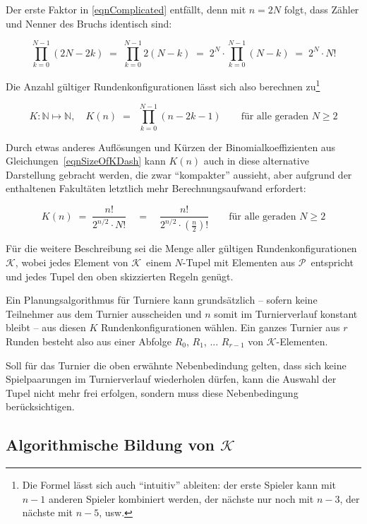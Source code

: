\documentclass[DIV=15, 10pt]{scrartcl}
\newcommand{\PSet}{$\mathcal{P}$}
\newcommand{\KSet}{$\mathcal{K}$}
\begin{document}
Der erste Faktor in \eqref{eqnComplicated} entfällt, denn mit $n = 2N$ folgt, dass Zähler und Nenner des Bruchs identisch sind:

\begin{equation*}
\prod_{k=0}^{N-1}(2N - 2k) \; = \;
\prod_{k=0}^{N-1}2(N-k) \; = \;
2^N \cdot \prod_{k=0}^{N-1}(N-k) \; = \; 2^N \cdot N!
\end{equation*}

Die Anzahl gültiger Rundenkonfigurationen lässt sich also berechnen zu\footnote{Die Formel lässt sich auch "`intuitiv"' ableiten: der erste Spieler kann mit $n-1$ anderen Spieler kombiniert werden, der nächste nur noch mit $n-3$, der nächste mit $n-5$, usw.}

\begin{equation}\label{eqnSizeOfK}
K: \mathbb{N} \mapsto \mathbb{N}, \quad K(n) \; = \; \
\prod_{k=0}^{N-1}(n - 2k -1) \qquad \text{für alle geraden }N \geq 2
\end{equation}

Durch etwas anderes Auflösungen und Kürzen der Binomialkoeffizienten aus Gleichungen~\eqref{eqnSizeOfKDash} kann $K(n)$ auch in diese alternative Darstellung gebracht werden, die zwar "`kompakter"' aussieht, aber aufgrund der enthaltenen Fakultäten letztlich mehr Berechnungsaufwand erfordert:

\begin{equation}\label{eqnSizeOfK1}
K(n) \; = \; \frac{n!}{2^{n/2} \cdot N!} \quad = \quad \frac{n!}{2^{n/2} \cdot \left(\frac{n}{2}\right)!} \qquad \text{für alle geraden }N \geq 2
\end{equation}


Für die weitere Beschreibung sei die Menge aller gültigen Rundenkonfigurationen \KSet, wobei jedes Element von \KSet\ einem $N$-Tupel mit Elementen aus \PSet\ entspricht und jedes Tupel den oben skizzierten Regeln genügt.

Ein Planungsalgorithmus für Turniere kann grundsätzlich -- sofern keine Teilnehmer aus dem Turnier ausscheiden und $n$ somit im Turnierverlauf konstant bleibt -- aus diesen $K$ Rundenkonfigurationen wählen. Ein ganzes Turnier aus $r$ Runden besteht also aus einer Abfolge $R_0$, $R_1$, ... $R_{r-1}$ von \KSet -Elementen.

Soll für das Turnier die oben erwähnte Nebenbedindung gelten, dass sich keine Spielpaarungen im Turnierverlauf wiederholen dürfen, kann die Auswahl der Tupel nicht mehr frei erfolgen, sondern muss diese Nebenbedingung berücksichtigen.

\subsection{Algorithmische Bildung von \KSet}
\end{document}
